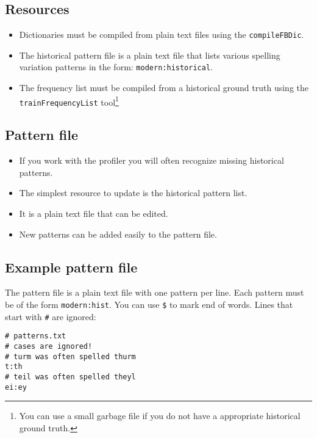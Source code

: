 \subsection{Resources}
\begin{frame}
	\begin{itemize}
		\item Dictionaries must be compiled from plain text files using the
			\texttt{compileFBDic}.
		\item The historical pattern file is a plain text file that lists various
			spelling variation patterns in the form: \texttt{modern:historical}.
		\item The frequency list must be compiled from a historical ground truth
			using the \texttt{trainFrequencyList} tool\footnote{You can use a small
			garbage file if you do not have a appropriate historical ground truth.}
	\end{itemize}
\end{frame}

\subsection{Pattern file}
\begin{frame}
	\begin{itemize}
		\item If you work with the profiler you will often recognize missing
			historical patterns.
		\item The simplest resource to update is the historical pattern list.
		\item It is a plain text file that can be edited.
		\item New patterns can be added easily to the pattern file.
	\end{itemize}
\end{frame}

\subsection{Example pattern file}
\begin{frame}[fragile]
	The pattern file is a plain text file with one pattern per line. Each pattern
	must be of the form \texttt{modern:hist}. You can use \texttt{\$} to mark end
	of words. Lines that start with \texttt{\#} are ignored:

\begin{verbatim}
# patterns.txt
# cases are ignored!
# turm was often spelled thurm
t:th
# teil was often spelled theyl
ei:ey
\end{verbatim}
\end{frame}

